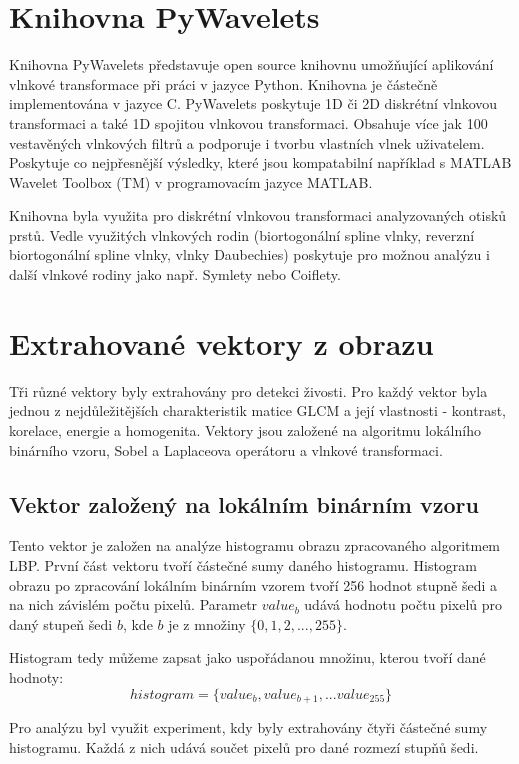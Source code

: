 \section{Knihovna PyWavelets}
Knihovna PyWavelets představuje open source knihovnu umožňující aplikování vlnkové transformace při práci v jazyce Python. Knihovna je částečně implementována v jazyce C. PyWavelets poskytuje 1D či 2D diskrétní vlnkovou transformaci a také 1D spojitou vlnkovou transformaci. Obsahuje více jak 100 vestavěných vlnkových filtrů a podporuje i tvorbu vlastních vlnek uživatelem. Poskytuje co nejpřesnější výsledky, které jsou kompatabilní například s MATLAB Wavelet Toolbox (TM) v programovacím jazyce MATLAB.

Knihovna byla využita pro diskrétní vlnkovou transformaci analyzovaných otisků prstů. Vedle využitých vlnkových rodin (biortogonální spline vlnky, reverzní biortogonální spline vlnky, vlnky Daubechies) poskytuje pro možnou analýzu i další vlnkové rodiny jako např. Symlety nebo Coiflety. \cite{PywtAbout}

\section{Extrahované vektory z obrazu}
Tři různé vektory byly extrahovány pro detekci živosti. Pro každý vektor byla jednou z nejdůležitějších charakteristik matice GLCM a její vlastnosti - kontrast, korelace, energie a homogenita. Vektory jsou založené na algoritmu lokálního binárního vzoru, Sobel a Laplaceova operátoru a vlnkové transformaci.

\subsection{Vektor založený na lokálním binárním vzoru}
Tento vektor je založen na analýze histogramu obrazu zpracovaného algoritmem LBP. První část vektoru tvoří částečné sumy daného histogramu. Histogram obrazu po zpracování lokálním binárním vzorem tvoří 256 hodnot stupně šedi a na nich závislém počtu pixelů. Parametr $value_b$ udává hodnotu počtu pixelů pro daný stupeň šedi $b$, kde $b$ je z množiny $\{0,1,2,...,255\}$.

Histogram tedy můžeme zapsat jako uspořádanou množinu, kterou tvoří dané hodnoty:
$$histogram = \{value_b, value_{b+1}, ... value_{255}\}$$

Pro analýzu byl využit experiment, kdy byly extrahovány čtyři částečné sumy histogramu. Každá z nich udává součet pixelů pro dané rozmezí stupňů šedi.

